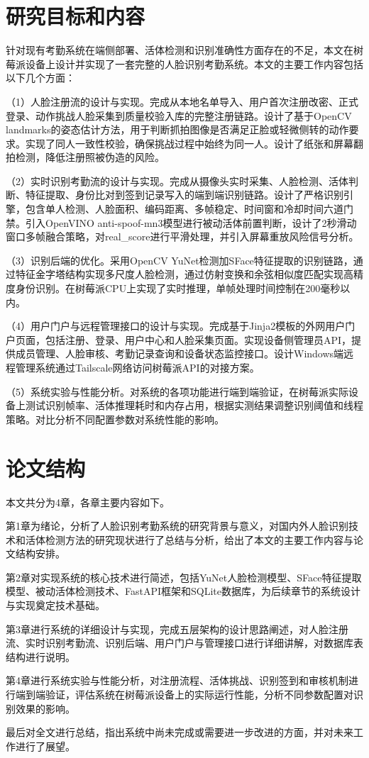 \section{研究目标和内容}

针对现有考勤系统在端侧部署、活体检测和识别准确性方面存在的不足，本文在树莓派设备上设计并实现了一套完整的人脸识别考勤系统。本文的主要工作内容包括以下几个方面：

（1）人脸注册流的设计与实现。完成从本地名单导入、用户首次注册改密、正式登录、动作挑战人脸采集到质量校验入库的完整注册链路。设计了基于OpenCV landmarks的姿态估计方法，用于判断抓拍图像是否满足正脸或轻微侧转的动作要求。实现了同人一致性校验，确保挑战过程中始终为同一人。设计了纸张和屏幕翻拍检测，降低注册照被伪造的风险。

（2）实时识别考勤流的设计与实现。完成从摄像头实时采集、人脸检测、活体判断、特征提取、身份比对到签到记录写入的端到端识别链路。设计了严格识别引擎，包含单人检测、人脸面积、编码距离、多帧稳定、时间窗和冷却时间六道门禁。引入OpenVINO anti-spoof-mn3模型进行被动活体前置判断，设计了2秒滑动窗口多帧融合策略，对real\_score进行平滑处理，并引入屏幕重放风险信号分析。

（3）识别后端的优化。采用OpenCV YuNet检测加SFace特征提取的识别链路，通过特征金字塔结构实现多尺度人脸检测，通过仿射变换和余弦相似度匹配实现高精度身份识别。在树莓派CPU上实现了实时推理，单帧处理时间控制在200毫秒以内。

（4）用户门户与远程管理接口的设计与实现。完成基于Jinja2模板的外网用户门户页面，包括注册、登录、用户中心和人脸采集页面。实现设备侧管理员API，提供成员管理、人脸审核、考勤记录查询和设备状态监控接口。设计Windows端远程管理系统通过Tailscale网络访问树莓派API的对接方案。

（5）系统实验与性能分析。对系统的各项功能进行端到端验证，在树莓派实际设备上测试识别帧率、活体推理耗时和内存占用，根据实测结果调整识别阈值和线程策略。对比分析不同配置参数对系统性能的影响。

\section{论文结构}

本文共分为4章，各章主要内容如下。

第1章为绪论，分析了人脸识别考勤系统的研究背景与意义，对国内外人脸识别技术和活体检测方法的研究现状进行了总结与分析，给出了本文的主要工作内容与论文结构安排。

第2章对实现系统的核心技术进行简述，包括YuNet人脸检测模型、SFace特征提取模型、被动活体检测技术、FastAPI框架和SQLite数据库，为后续章节的系统设计与实现奠定技术基础。

第3章进行系统的详细设计与实现，完成五层架构的设计思路阐述，对人脸注册流、实时识别考勤流、识别后端、用户门户与管理接口进行详细讲解，对数据库表结构进行说明。

第4章进行系统实验与性能分析，对注册流程、活体挑战、识别签到和审核机制进行端到端验证，评估系统在树莓派设备上的实际运行性能，分析不同参数配置对识别效果的影响。

最后对全文进行总结，指出系统中尚未完成或需要进一步改进的方面，并对未来工作进行了展望。
